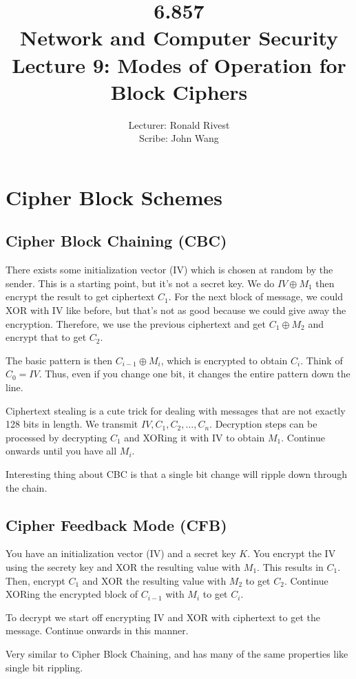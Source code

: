 \documentclass[psamsfonts]{amsart}
\title{6.857 \\
Network and Computer Security \\
Lecture 9: Modes of Operation for Block Ciphers}
\author{Lecturer: Ronald Rivest\\
Scribe: John Wang}
\begin{document}
\maketitle

\section{Cipher Block Schemes}

\subsection{Cipher Block Chaining (CBC)}

There exists some initialization vector (IV) which is chosen at random by the sender. This is a starting point, but it's not a secret key. We do $IV \oplus M_1$ then encrypt the result to get ciphertext $C_1$. For the next block of message, we could XOR with IV like before, but that's not as good because we could give away the encryption. Therefore, we use the previous ciphertext and get $C_1 \oplus M_2$ and encrypt that to get $C_2$.

The basic pattern is then $C_{i-1} \oplus M_i$, which is encrypted to obtain $C_i$. Think of $C_{0} = IV$. Thus, even if you change one bit, it changes the entire pattern down the line.

Ciphertext stealing is a cute trick for dealing with messages that are not exactly 128 bits in length. We transmit $IV, C_1, C_2, \ldots, C_n$. Decryption steps can be processed by decrypting $C_1$ and XORing it with IV to obtain $M_1$. Continue onwards until you have all $M_{i}$.

Interesting thing about CBC is that a single bit change will ripple down through the chain.

\subsection{Cipher Feedback Mode (CFB)}

You have an initialization vector (IV) and a secret key $K$. You encrypt the IV using the secrety key and XOR the resulting value with $M_1$. This results in $C_1$. Then, encrypt $C_1$ and XOR the resulting value with $M_2$ to get $C_2$. Continue XORing the encrypted block of $C_{i-1}$ with $M_i$ to get $C_i$.

To decrypt we start off encrypting IV and XOR with ciphertext to get the message. Continue onwards in this manner.

Very similar to Cipher Block Chaining, and has many of the same properties like single bit rippling.
\end{document}
